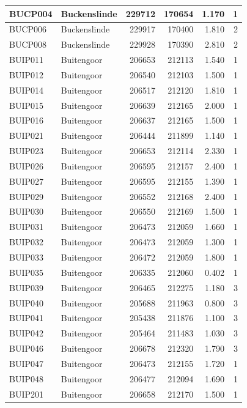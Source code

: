 \documentclass[11pt,]{book}
\begin{document}
\begin{table}
\begin{tabular}[t]{l|l|r|r|r|r}
\hline
BUCP004 & Buckenslinde & 229712 & 170654 & 1.170 & 1\\
\hline
BUCP006 & Buckenslinde & 229917 & 170400 & 1.810 & 2\\
\hline
BUCP008 & Buckenslinde & 229928 & 170390 & 2.810 & 2\\
\hline
BUIP011 & Buitengoor & 206653 & 212113 & 1.540 & 1\\
\hline
BUIP012 & Buitengoor & 206540 & 212103 & 1.500 & 1\\
\hline
BUIP014 & Buitengoor & 206517 & 212120 & 1.810 & 1\\
\hline
BUIP015 & Buitengoor & 206639 & 212165 & 2.000 & 1\\
\hline
BUIP016 & Buitengoor & 206637 & 212165 & 1.500 & 1\\
\hline
BUIP021 & Buitengoor & 206444 & 211899 & 1.140 & 1\\
\hline
BUIP023 & Buitengoor & 206653 & 212114 & 2.330 & 1\\
\hline
BUIP026 & Buitengoor & 206595 & 212157 & 2.400 & 1\\
\hline
BUIP027 & Buitengoor & 206595 & 212155 & 1.390 & 1\\
\hline
BUIP029 & Buitengoor & 206552 & 212168 & 2.400 & 1\\
\hline
BUIP030 & Buitengoor & 206550 & 212169 & 1.500 & 1\\
\hline
BUIP031 & Buitengoor & 206473 & 212059 & 1.660 & 1\\
\hline
BUIP032 & Buitengoor & 206473 & 212059 & 1.300 & 1\\
\hline
BUIP033 & Buitengoor & 206472 & 212059 & 1.800 & 1\\
\hline
BUIP035 & Buitengoor & 206335 & 212060 & 0.402 & 1\\
\hline
BUIP039 & Buitengoor & 206465 & 212275 & 1.180 & 3\\
\hline
BUIP040 & Buitengoor & 205688 & 211963 & 0.800 & 3\\
\hline
BUIP041 & Buitengoor & 205438 & 211876 & 1.100 & 3\\
\hline
BUIP042 & Buitengoor & 205464 & 211483 & 1.030 & 3\\
\hline
BUIP046 & Buitengoor & 206678 & 212320 & 1.790 & 3\\
\hline
BUIP047 & Buitengoor & 206473 & 212155 & 1.720 & 1\\
\hline
BUIP048 & Buitengoor & 206477 & 212094 & 1.690 & 1\\
\hline
BUIP201 & Buitengoor & 206658 & 212170 & 1.500 & 1\\

\end{tabular}
\end{table}
\end{document}

